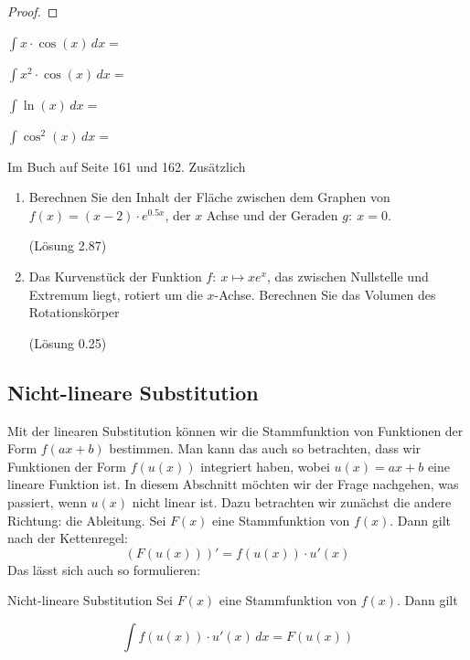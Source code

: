 \begin{proof}
    
    \vspace*{3cm}
\end{proof}

\begin{bsp}
    {}{}
    $\int x\cdot \cos(x) \, dx = $
    \vspace*{2cm} 
\end{bsp}
\begin{bsp}
    {}{}
    $\int x^2 \cdot \cos(x) \, dx= $
    \vspace*{6cm} 
\end{bsp}

\begin{bsp}
    {}{}
    $\int \ln(x) \, dx= $
    \vspace*{4cm} 
\end{bsp}

\begin{bsp}
    {}{}
    $\int \cos^2(x) \, dx= $
    \vspace*{8cm} 
\end{bsp}
\begin{ueb}
    {}{}
    Im Buch auf Seite 161 und 162.
    Zusätzlich
    \begin{enumerate}
        \item Berechnen Sie den Inhalt der Fläche zwischen dem Graphen von $f(x) = (x-2)\cdot e^{0.5x}$, der $x$ Achse und der Geraden $g: \: x=0$.
        
        (Lösung 2.87)
        \item Das Kurvenstück der Funktion $f:\: x\mapsto xe^x$, das zwischen Nullstelle und Extremum liegt, rotiert um die $x$-Achse. Berechnen Sie das Volumen des Rotationskörper
        
        (Lösung 0.25)
    \end{enumerate}
\end{ueb}
\clearpage
\subsection*{Nicht-lineare Substitution}
Mit der linearen Substitution können wir die Stammfunktion von Funktionen der Form $f(ax+b)$ bestimmen. Man kann das auch so betrachten, dass wir Funktionen der Form $f(u(x))$ integriert haben, wobei $u(x)=ax+b$ eine lineare Funktion ist. In diesem Abschnitt möchten wir der Frage nachgehen, was passiert, wenn $u(x)$ nicht linear ist. Dazu betrachten wir zunächst die andere Richtung: die Ableitung. Sei $F(x)$ eine Stammfunktion von $f(x)$. Dann gilt nach der Kettenregel:
$$\left( F(u(x)) \right)' = f(u(x)) \cdot u'(x)$$
Das lässt sich auch so formulieren:
\begin{satz}
    {Nicht-lineare Substitution}{}
    Sei $F(x)$ eine Stammfunktion von $f(x)$. Dann gilt

\[
\int f(u(x)) \cdot u'(x) \, dx = F(u(x))
\]

\end{satz}

